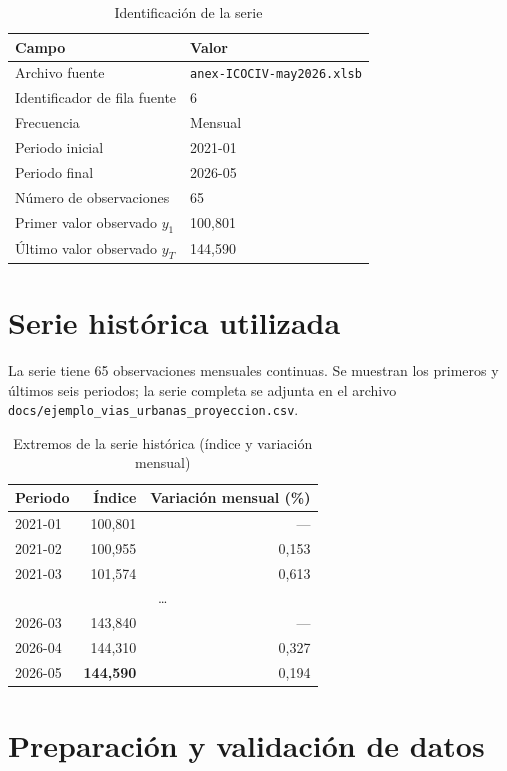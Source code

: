 \documentclass[11pt,letterpaper]{article}
\begin{document}
\begin{table}[H]
\centering
\caption{Identificación de la serie}
\begin{tabular}{@{}ll@{}}
\toprule
\textbf{Campo} & \textbf{Valor} \\
\midrule
Archivo fuente & \texttt{anex-ICOCIV-may2026.xlsb} \\
Identificador de fila fuente & 6 \\
Frecuencia & Mensual \\
Periodo inicial & 2021-01 \\
Periodo final & 2026-05 \\
Número de observaciones & 65 \\
Primer valor observado \(y_1\) & 100{,}801 \\
Último valor observado \(y_T\) & 144{,}590 \\
\bottomrule
\end{tabular}
\end{table}

\section{Serie histórica utilizada}

La serie tiene 65 observaciones mensuales continuas. Se muestran los primeros y
últimos seis periodos; la serie completa se adjunta en el archivo
\texttt{docs/ejemplo\_vias\_urbanas\_proyeccion.csv}.

\begin{table}[H]
\centering
\caption{Extremos de la serie histórica (índice y variación mensual)}
\begin{tabular}{@{}lrr@{}}
\toprule
\textbf{Periodo} & \textbf{Índice} & \textbf{Variación mensual (\%)} \\
\midrule
2021-01 & 100{,}801 & --- \\
2021-02 & 100{,}955 & 0{,}153 \\
2021-03 & 101{,}574 & 0{,}613 \\
\multicolumn{3}{c}{\dots} \\
2026-03 & 143{,}840 & --- \\
2026-04 & 144{,}310 & 0{,}327 \\
2026-05 & \textbf{144{,}590} & 0{,}194 \\
\bottomrule
\end{tabular}
\end{table}

\section{Preparación y validación de datos}
\end{document}
